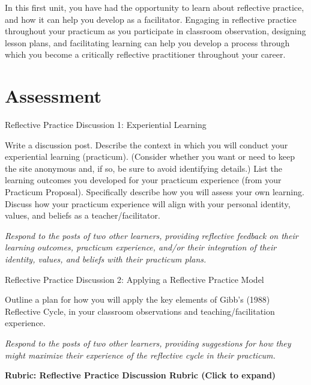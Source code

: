 \documentclass[
]{book}
\begin{document}
In this first unit, you have had the opportunity to learn about reflective practice, and how it can help you develop as a facilitator. Engaging in reflective practice throughout your practicum as you participate in classroom observation, designing lesson plans, and facilitating learning can help you develop a process through which you become a critically reflective practitioner throughout your career.

\hypertarget{assessment-1}{%
\section*{Assessment}\label{assessment-1}}

\begin{assessment}
{Reflective Practice Discussion 1: Experiential Learning}

Write a discussion post. Describe the context in which you will conduct your experiential learning (practicum). (Consider whether you want or need to keep the site anonymous and, if so, be sure to avoid identifying details.) List the learning outcomes you developed for your practicum experience (from your Practicum Proposal). Specifically describe how you will assess your own learning. Discuss how your practicum experience will align with your personal identity, values, and beliefs as a teacher/facilitator.

\emph{Respond to the posts of two other learners, providing reflective feedback on their learning outcomes, practicum experience, and/or their integration of their identity, values, and beliefs with their practicum plans.}

{Reflective Practice Discussion 2: Applying a Reflective Practice Model}

Outline a plan for how you will apply the key elements of Gibb's (1988) Reflective Cycle, in your classroom observations and teaching/facilitation experience.

\emph{Respond to the posts of two other learners, providing suggestions for how they might maximize their experience of the reflective cycle in their practicum.}

\textbf{Rubric: Reflective Practice Discussion Rubric (Click to expand)}


\end{assessment}
\end{document}
